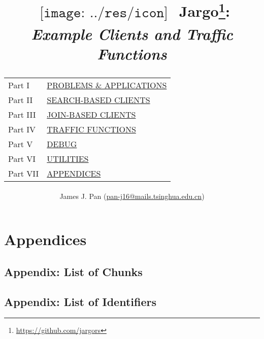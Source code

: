 \documentclass{report}
\title{
  $
  \begin{array}{l}
  \texttt{[image: ../res/icon]}
  \end{array}
  $
  Jargo\footnote{\url{https://github.com/jargors}}:\\
  \large{\textbf{\textit{Example Clients and Traffic Functions}}}\\
  \vspace{2em}
  {
    \small
    \begin{tabular}{lp{.6\textwidth}}
    \toprule
    Part I &\hyperref[part-problems]{\textsc{PROBLEMS \& APPLICATIONS}}\\
    Part II &\hyperref[part-search]{\textsc{SEARCH-BASED CLIENTS}}\\
    Part III &\hyperref[part-join]{\textsc{JOIN-BASED CLIENTS}}\\
    Part IV &\hyperref[part-traffic]{\textsc{TRAFFIC FUNCTIONS}}\\
    Part V &\hyperref[part-debug]{\textsc{DEBUG}}\\
    Part VI &\hyperref[part-utilities]{\textsc{UTILITIES}}\\
    Part VII &\hyperref[part-appendices]{\textsc{APPENDICES}}\\
    \bottomrule
    \end{tabular}
  }
}
\author{
  \small{James J. Pan (\href{mailto:pan-j16@mails.tsinghua.edu.cn}{pan-j16@mails.tsinghua.edu.cn})}
}
\theoremstyle{definition}                   %
\begin{document}
\maketitle
\pagestyle{noweb}

\renewcommand{\thepage}{\roman{page}}
\setcounter{page}{1}

\tableofcontents



\part{Appendices}
\label{part-appendices}

\appendix

\chapter{Appendix: List of Chunks}
\nowebchunks

\chapter{Appendix: List of Identifiers}
\nowebindex
\end{document}
